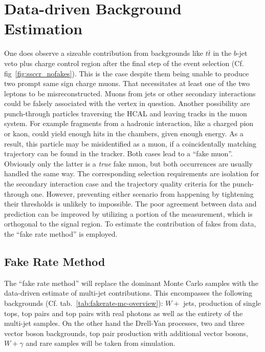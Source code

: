 \chapter{Data-driven Background Estimation}
\label{cha:datadrivenbg}

One does observe a sizeable contribution from backgrounds like $t\bar{t}$ in the $b$-jet veto plus charge control region after the final step of the event selection (Cf. fig~\ref{fig:ssccr_nofakes}). This is the case despite them being unable to produce two prompt same sign charge muons. That necessitates at least one of the two leptons to be misreconstructed. Muons from jets or other secondary interactions could be falsely associated with the vertex in question. Another possibility are punch-through particles traversing the HCAL and leaving tracks in the muon system. For example fragments from a hadronic interaction, like a charged pion or kaon, could yield enough hits in the chambers, given enough energy. As a result, this particle may be misidentified as a muon, if a coincidentally matching trajectory can be found in the tracker. Both cases lead to a ``fake muon''. Obviously only the latter is a \textit{true} fake muon, but both occurrences are usually handled the same way. The corresponding selection requirements are isolation for the secondary interaction case and the trajectory quality criteria for the punch-through one. However, preventing either scenario from happening by tightening their thresholds is unlikely to impossible. The poor agreement between data and prediction can be improved by utilizing a portion of the measurement, which is orthogonal to the signal region. To estimate the contribution of fakes from data, the ``fake rate method'' is employed.


\section{Fake Rate Method}
\label{sec:fakerate}

The ``fake rate method'' will replace the dominant Monte Carlo samples with the data-driven estimate of multi-jet contributions. This encompasses the following backgrounds (Cf. tab.~\ref{tab:fakerate-mc-overview}): $W +$ jets, production of single tops, top pairs and top pairs with real photons as well as the entirety of the multi-jet samples. On the other hand the Drell-Yan processes, two and three vector boson backgrounds, top pair production with additional vector bosons, $W + \gamma$ and rare samples will be taken from simulation.

